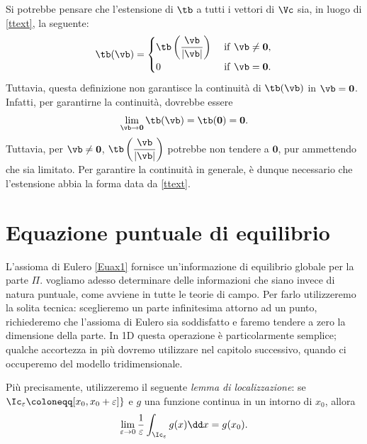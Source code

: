 \begin{remark}
	Si potrebbe pensare che l'estensione di $\tb$ a tutti i vettori di $\Vc$ sia, in luogo di \eqref{ttext}, la seguente:
	\begin{equation}
		\tb(\vb)=
		\begin{cases}\tb\left(\dfrac{\vb}{|\vb|}\right)&\mathrm{~if~}\vb\neq\mathbf{0},\\[.2cm]
			0&\mathrm{~if~}\vb=\mathbf{0}.
		\end{cases}
	\end{equation}
Tuttavia, questa definizione non garantisce la continuità di $\tb(\vb)$ in $\vb=\mathbf{0}$.  Infatti, per garantirne la continuità, dovrebbe essere
\begin{equation}
\lim_{\vb\to\mathbf{0}}\tb(\vb)=\tb(\mathbf{0})=\mathbf{0}.
\end{equation}
Tuttavia, per $\vb\neq \mathbf{0}$,  $\tb\left(\dfrac{\vb}{|\vb|}\right)$ potrebbe non tendere a $\mathbf{0}$, pur ammettendo che sia limitato. Per garantire la continuità in generale, è dunque necessario  che l'estensione abbia la forma data da \eqref{ttext}.
\end{remark}


\section{Equazione puntuale di equilibrio}
L'assioma di Eulero \eqref{Euax1} fornisce un'informazione di equilibrio globale per la parte $\Pi$.  vogliamo adesso determinare delle informazioni che siano invece di natura puntuale, come avviene in tutte le teorie di campo. Per farlo utilizzeremo la solita tecnica: sceglieremo un parte infinitesima attorno ad un punto, richiederemo che l'assioma di Eulero sia soddisfatto e faremo tendere a zero la dimensione della parte. In 1D questa operazione è particolarmente semplice; qualche accortezza in più dovremo utilizzare nel capitolo successivo, quando ci occuperemo del modello tridimensionale.

Più precisamente,  utilizzeremo il seguente \textit{lemma di localizzazione}: se $\Ic_\varepsilon\coloneqq[x_0, x_0+\varepsilon] \}$  e $g$ una funzione continua in un intorno di $x_0$, allora
\begin{equation}\label{loc1}
	\lim_{\varepsilon\to 0}\frac{1}{\varepsilon}\int_{\Ic_\varepsilon}g(x)\dd x=g(x_0).
\end{equation}

